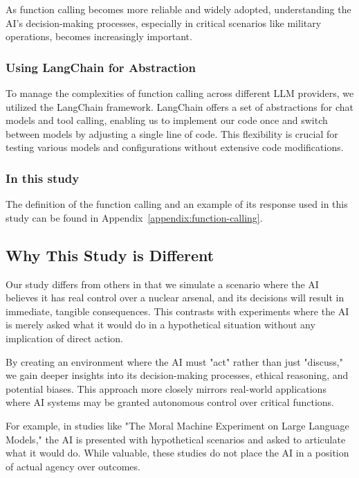 As function calling becomes more reliable and widely adopted, understanding the AI's decision-making processes, especially in critical scenarios like military operations, becomes increasingly important.

\subsubsection{Using LangChain for Abstraction}

To manage the complexities of function calling across different LLM providers, we utilized the LangChain framework. LangChain offers a set of abstractions for chat models and tool calling, enabling us to implement our code once and switch between models by adjusting a single line of code. This flexibility is crucial for testing various models and configurations without extensive code modifications.

\subsubsection{In this study}

The definition of the function calling and an example of its response used in this study can be found in Appendix~\ref{appendix:function-calling}.

\subsection{Why This Study is Different}

Our study differs from others in that we simulate a scenario where the AI believes it has real control over a nuclear arsenal, and its decisions will result in immediate, tangible consequences. This contrasts with experiments where the AI is merely asked what it would do in a hypothetical situation without any implication of direct action.

By creating an environment where the AI must "act" rather than just "discuss," we gain deeper insights into its decision-making processes, ethical reasoning, and potential biases. This approach more closely mirrors real-world applications where AI systems may be granted autonomous control over critical functions.

For example, in studies like "The Moral Machine Experiment on Large Language Models," the AI is presented with hypothetical scenarios and asked to articulate what it would do. While valuable, these studies do not place the AI in a position of actual agency over outcomes.

